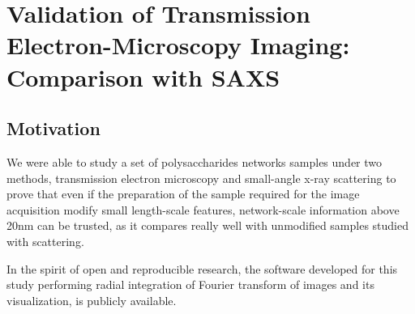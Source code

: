 
\chapter{Validation of Transmission Electron-Microscopy Imaging: Comparison with SAXS}

\label{Chapter-TEMSAXS} %


\section{Motivation}

We were able to study a set of polysaccharides networks samples under two methods, transmission electron microscopy and small-angle x-ray scattering to prove that even if the preparation of the sample required for the image acquisition modify small length-scale features, network-scale information above 20nm can be trusted, as it compares really well with unmodified samples studied with scattering.

In the spirit of open and reproducible research, the software developed for this study performing radial integration of Fourier transform of images and its visualization, is publicly available.

